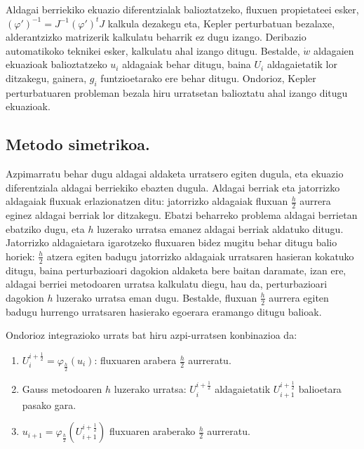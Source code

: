 Aldagai berriekiko ekuazio diferentzialak balioztatzeko, fluxuen propietateei esker, $(\varphi')^{-1}=J^{-1}(\varphi')^tJ$ kalkula dezakegu eta, Kepler perturbatuan bezalaxe, alderantzizko matrizerik kalkulatu beharrik ez dugu izango. Deribazio automatikoko teknikei esker, kalkulatu ahal izango ditugu. Bestalde, $\dot{w}$ aldagaien ekuazioak balioztatzeko $u_i$ aldagaiak behar ditugu, baina $U_i$ aldagaietatik lor ditzakegu, gainera, $g_i$ funtzioetarako ere behar ditugu. Ondorioz, Kepler perturbatuaren probleman bezala hiru urratsetan balioztatu ahal izango ditugu ekuazioak.



\subsection*{Metodo simetrikoa.}

Azpimarratu behar dugu aldagai aldaketa urratsero egiten dugula, eta ekuazio diferentziala aldagai berriekiko ebazten dugula. Aldagai berriak eta jatorrizko aldagaiak fluxuak erlazionatzen ditu: jatorrizko aldagaiak fluxuan $\frac{h}{2}$ aurrera eginez aldagai berriak lor ditzakegu. Ebatzi beharreko problema aldagai berrietan ebatziko dugu, eta $h$ luzerako urratsa emanez aldagai berriak aldatuko ditugu. Jatorrizko aldagaietara igarotzeko fluxuaren bidez mugitu behar ditugu balio horiek: $\frac{h}{2}$ atzera egiten badugu jatorrizko aldagaiak urratsaren hasieran kokatuko ditugu, baina perturbazioari dagokion aldaketa bere baitan daramate, izan ere, aldagai berriei metodoaren urratsa kalkulatu diegu, hau da, perturbazioari dagokion $h$ luzerako urratsa eman dugu. Bestalde, fluxuan $\frac{h}{2}$ aurrera egiten badugu hurrengo urratsaren hasierako egoerara eramango ditugu balioak.

Ondorioz integrazioko urrats bat hiru azpi-urratsen konbinazioa da:
\begin{enumerate}
\item $U_i^{i+\frac{1}{2}}=\varphi_{\frac{h}{2}}(u_i)$: fluxuaren arabera $\frac{h}{2}$ aurreratu.
\item Gauss metodoaren $h$ luzerako urratsa: $U_i^{i+\frac{1}{2}}$ aldagaietatik  $U_{i+1}^{i+\frac{1}{2}}$ balioetara pasako gara.
\item $u_{i+1}=\varphi_{\frac{h}{2}}(U_{i+1}^{i+\frac{1}{2}})$ fluxuaren araberako $\frac{h}{2}$ aurreratu.
\end{enumerate}


